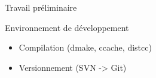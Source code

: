 \documentclass{beamer}
\begin{document}
\begin{frame}{Travail préliminaire}
    \begin{block}{Environnement de développement}
        \begin{itemize}[<+->]
            \item Compilation (dmake, ccache, distcc)
            \item Versionnement (SVN -> Git)
        \end{itemize}
    \end{block}
\end{frame}
\end{document}
